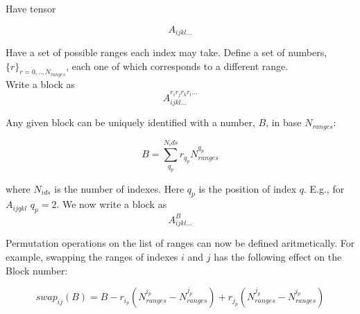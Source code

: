 \documentclass[12pt]{article}
\begin{document}
Have tensor

\begin{equation}
A_{ijkl...}
\end{equation}

\noindent Have a set of possible ranges each index may take. Define a set of numbers, $\{r\}_{r=0,..,N_{ranges}} $,
each one of which corresponds to a different range.\\

\noindent Write a block as
\begin{equation}
A_{ijkl...}^{r_{i} r_{j}r_{k}r_{l}...}
\end{equation}

\noindent Any given block can be uniquely identified with a number, $B$, in base $N_{ranges}$:

\begin{equation}
B = \sum_{q_{p}}^{N_ids} r_{q_{p}}N_{ranges}^{q_{p}}
\end{equation}

\noindent where $N_{ids}$ is the number of indexes. Here $q_{p}$ is the position of index $q$. E.g., 
for $A_{ijqkl}$  $q_{p} = 2$.  We now write a block as
\begin{equation}
A_{ijkl...}^{B}
\end{equation}

\noindent Permutation operations on the list of ranges can now be defined aritmetically. For example,
swapping the ranges of indexes $i$ and $j$ has the following effect on the Block number:
 
\begin{equation}
swap_{ij}(B)  = B  - r_{i_{p}}(N_{ranges}^{i_{p}} - N_{ranges}^{j_{p}}) + r_{j_{p}}(N_{ranges}^{j_{p}} - N_{ranges}^{i_{p}})
\end{equation}
\end{document}
